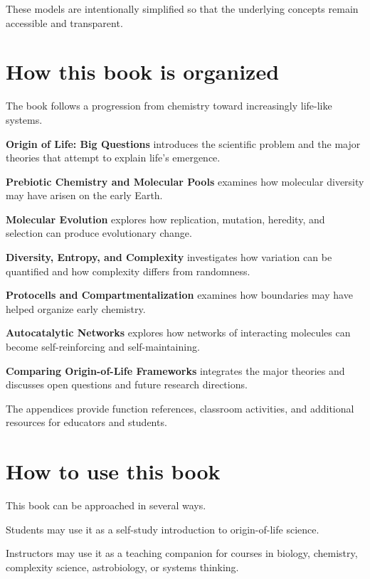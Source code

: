 \documentclass[
  oneside,
  openany]{book}
\begin{document}
These models are intentionally simplified so that the underlying concepts remain accessible and transparent.

\section*{How this book is organized}\label{how-this-book-is-organized}

The book follows a progression from chemistry toward increasingly life-like systems.

\textbf{Origin of Life: Big Questions} introduces the scientific problem and the major theories that attempt to explain life's emergence.

\textbf{Prebiotic Chemistry and Molecular Pools} examines how molecular diversity may have arisen on the early Earth.

\textbf{Molecular Evolution} explores how replication, mutation, heredity, and selection can produce evolutionary change.

\textbf{Diversity, Entropy, and Complexity} investigates how variation can be quantified and how complexity differs from randomness.

\textbf{Protocells and Compartmentalization} examines how boundaries may have helped organize early chemistry.

\textbf{Autocatalytic Networks} explores how networks of interacting molecules can become self-reinforcing and self-maintaining.

\textbf{Comparing Origin-of-Life Frameworks} integrates the major theories and discusses open questions and future research directions.

The appendices provide function references, classroom activities, and additional resources for educators and students.

\section*{How to use this book}\label{how-to-use-this-book}

This book can be approached in several ways.

Students may use it as a self-study introduction to origin-of-life science.

Instructors may use it as a teaching companion for courses in biology, chemistry, complexity science, astrobiology, or systems thinking.
\end{document}
